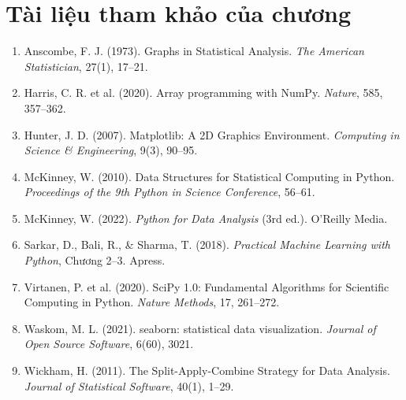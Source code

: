 \section*{Tài liệu tham khảo của chương}
\begin{enumerate}
    \item Anscombe, F. J. (1973). Graphs in Statistical Analysis. \textit{The American Statistician}, 27(1), 17--21.
    \item Harris, C. R. et al. (2020). Array programming with NumPy. \textit{Nature}, 585, 357--362.
    \item Hunter, J. D. (2007). Matplotlib: A 2D Graphics Environment. \textit{Computing in Science \& Engineering}, 9(3), 90--95.
    \item McKinney, W. (2010). Data Structures for Statistical Computing in Python. \textit{Proceedings of the 9th Python in Science Conference}, 56--61.
    \item McKinney, W. (2022). \textit{Python for Data Analysis} (3rd ed.). O'Reilly Media.
    \item Sarkar, D., Bali, R., \& Sharma, T. (2018). \textit{Practical Machine Learning with Python}, Chương 2--3. Apress.
    \item Virtanen, P. et al. (2020). SciPy 1.0: Fundamental Algorithms for Scientific Computing in Python. \textit{Nature Methods}, 17, 261--272.
    \item Waskom, M. L. (2021). seaborn: statistical data visualization. \textit{Journal of Open Source Software}, 6(60), 3021.
    \item Wickham, H. (2011). The Split-Apply-Combine Strategy for Data Analysis. \textit{Journal of Statistical Software}, 40(1), 1--29.
\end{enumerate}
